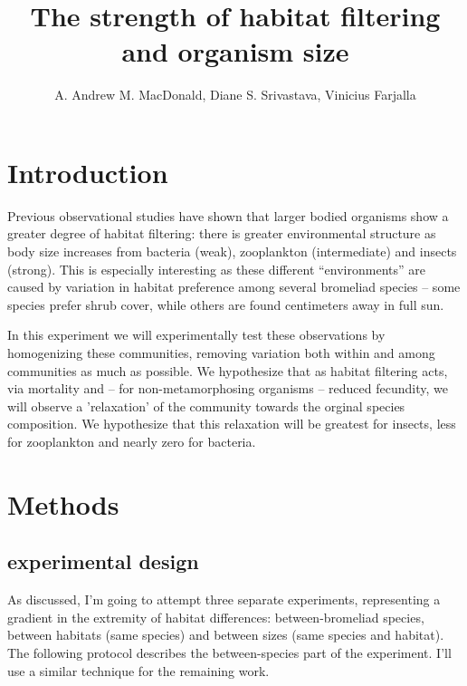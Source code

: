 \documentclass[10pt]{article}
\begin{document}
\title{The strength of habitat filtering and organism size} 
\author{A. Andrew M. MacDonald, Diane
  S. Srivastava, Vinicius Farjalla}
\begin{spacing}{2}
\maketitle

\linenumbers

\section{Introduction}

Previous observational studies \cite{Farjalla2012} have shown that
larger bodied organisms show a greater degree of habitat filtering:
there is greater environmental structure as body size increases from
bacteria (weak), zooplankton (intermediate) and insects (strong).
This is especially interesting as these different ``environments'' are
caused by variation in habitat preference among several bromeliad
species -- some species prefer shrub cover, while others are found
centimeters away in full sun.  

In this experiment we will experimentally test these observations by
homogenizing these communities, removing variation both within and
among communities as much as possible.  We hypothesize that as habitat
filtering acts, via mortality and -- for non-metamorphosing organisms
-- reduced fecundity, we will observe a 'relaxation' of the community
towards the orginal species composition.  We hypothesize that this
relaxation will be greatest for insects, less for zooplankton and
nearly zero for bacteria.

\section{Methods}

\subsection{experimental design}
\label{sec:expdesig}

As discussed, I'm going to attempt three separate experiments,
representing a gradient in the extremity of habitat differences:
between-bromeliad species, between habitats (same species) and between
sizes (same species and habitat).
The following protocol describes the between-species part of the
experiment.  I'll use a similar technique for the remaining work.


\end{spacing}
\end{document}
